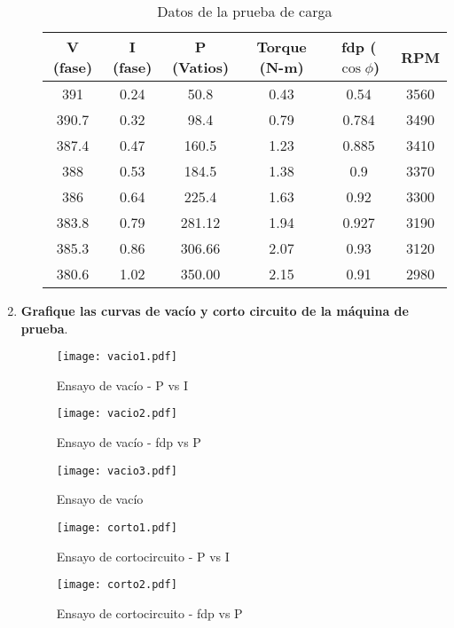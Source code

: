 \documentclass[a4paper,11pt]{article}
\begin{document}
\begin{enumerate}
\begin{itemize}
\begin{table}[H]
{\begin{tabular}{c|c|c|c|c|c}
                V (fase) & I (fase) & P (Vatios) & Torque (N-m) & fdp ($\cos\phi$) & RPM\\
                \hline
                391 & 0.24 & 50.8 & 0.43 & 0.54 & 3560\\
                \hline
                390.7 & 0.32 & 98.4 & 0.79 & 0.784 & 3490\\
                \hline
                387.4 & 0.47 & 160.5 & 1.23 & 0.885 & 3410\\
                \hline
                388 & 0.53 & 184.5 & 1.38 & 0.9 & 3370\\
                \hline
                386 & 0.64 & 225.4 & 1.63 & 0.92 & 3300\\
                \hline
                383.8 & 0.79 & 281.12 & 1.94 & 0.927 & 3190\\
                \hline
                385.3 & 0.86 & 306.66 & 2.07 & 0.93 & 3120\\
                \hline
                380.6 & 1.02 & 350.00 & 2.15 & 0.91 & 2980
            \end{tabular}}
            \caption{Datos de la prueba de carga}
        \end{table}
    \end{itemize}
    \newpage
    \item \textbf{Grafique las curvas de vacío y corto circuito de la máquina de prueba}.
    \begin{figure}[H]
        \centering
        \texttt{[image: vacio1.pdf]}
        \caption{Ensayo de vacío - P vs I}
    \end{figure}
    \begin{figure}[H]
        \centering
        \texttt{[image: vacio2.pdf]}
        \caption{Ensayo de vacío - fdp vs P}
    \end{figure}
    \begin{figure}[H]
        \centering
        \texttt{[image: vacio3.pdf]}
        \caption{Ensayo de vacío}
    \end{figure}
    \begin{figure}[H]
        \centering
        \texttt{[image: corto1.pdf]}
        \caption{Ensayo de cortocircuito - P vs I}
    \end{figure}
    \begin{figure}[H]
        \centering
        \texttt{[image: corto2.pdf]}
        \caption{Ensayo de cortocircuito - fdp vs P}
    \end{figure}

\end{enumerate}
\end{document}
